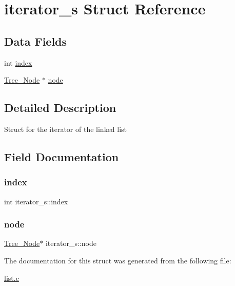 \hypertarget{structiterator__s}{}\section{iterator\+\_\+s Struct Reference}
\label{structiterator__s}
\subsection*{Data Fields}
\begin{DoxyCompactItemize}
\item 
int \mbox{\hyperlink{structiterator__s_a6191162fc508b597850d032b71fb0363}{index}}
\item 
\mbox{\hyperlink{list_8h_a68f0ccc88265f29ccc7b9c8133456b67}{Tree\+\_\+\+Node}} $\ast$ \mbox{\hyperlink{structiterator__s_afaa4ad97c9b335706923384cfb7f1fe1}{node}}
\end{DoxyCompactItemize}


\subsection{Detailed Description}
Struct for the iterator of the linked list 

\subsection{Field Documentation}
\mbox{\label{structiterator__s_a6191162fc508b597850d032b71fb0363}} 
\subsubsection{\texorpdfstring{index}{index}}
{\footnotesize\ttfamily int iterator\+\_\+s\+::index}

\mbox{\label{structiterator__s_afaa4ad97c9b335706923384cfb7f1fe1}} 
\subsubsection{\texorpdfstring{node}{node}}
{\footnotesize\ttfamily \mbox{\hyperlink{list_8h_a68f0ccc88265f29ccc7b9c8133456b67}{Tree\+\_\+\+Node}}$\ast$ iterator\+\_\+s\+::node}



The documentation for this struct was generated from the following file\+:\begin{DoxyCompactItemize}
\item 
\mbox{\hyperlink{list_8c}{list.\+c}}\end{DoxyCompactItemize}

